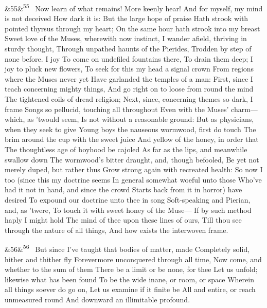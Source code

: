 \documentclass[12pt]{article}
\newcommand{\para}[1][]{\par\noindent\ifx&#1&\else\textsuperscript{\footnotesize #1}~\fi}
\begin{document}
\para[55] Now learn of what remains! More keenly hear! And for myself, my mind is not deceived How dark it is: But the large hope of praise Hath strook with pointed thyrsus through my heart; On the same hour hath strook into my breast Sweet love of the Muses, wherewith now instinct, I wander afield, thriving in sturdy thought, Through unpathed haunts of the Pierides, Trodden by step of none before. I joy To come on undefiled fountains there, To drain them deep; I joy to pluck new flowers, To seek for this my head a signal crown From regions where the Muses never yet Have garlanded the temples of a man: First, since I teach concerning mighty things, And go right on to loose from round the mind The tightened coils of dread religion; Next, since, concerning themes so dark, I frame Songs so pellucid, touching all throughout Even with the Muses' charm---which, as 'twould seem, Is not without a reasonable ground: But as physicians, when they seek to give Young boys the nauseous wormwood, first do touch The brim around the cup with the sweet juice And yellow of the honey, in order that The thoughtless age of boyhood be cajoled As far as the lips, and meanwhile swallow down The wormwood's bitter draught, and, though befooled, Be yet not merely duped, but rather thus Grow strong again with recreated health: So now I too (since this my doctrine seems In general somewhat woeful unto those Who've had it not in hand, and since the crowd Starts back from it in horror) have desired To expound our doctrine unto thee in song Soft-speaking and Pierian, and, as 'twere, To touch it with sweet honey of the Muse--- If by such method haply I might hold The mind of thee upon these lines of ours, Till thou see through the nature of all things, And how exists the interwoven frame.

\para[56] But since I've taught that bodies of matter, made Completely solid, hither and thither fly Forevermore unconquered through all time, Now come, and whether to the sum of them There be a limit or be none, for thee Let us unfold; likewise what has been found To be the wide inane, or room, or space Wherein all things soever do go on, Let us examine if it finite be All and entire, or reach unmeasured round And downward an illimitable profound.
\end{document}
